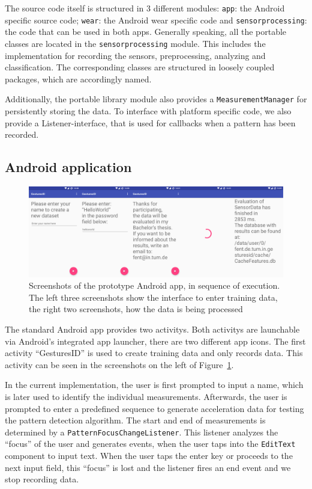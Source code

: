 The source code itself is structured in 3 different modules: \lstinline$app$: the Android specific source code; \lstinline$wear$: the Android wear specific code and \lstinline$sensorprocessing$: the code that can be used in both apps. Generally speaking, all the portable classes are located in the \lstinline$sensorprocessing$ module. This includes the implementation for recording the sensors, preprocessing, analyzing and classification. The corresponding classes are structured in loosely coupled \glspl{package}, which are accordingly named.

Additionally, the portable library module also provides a \lstinline$MeasurementManager$ for persistently storing the data. To interface with platform specific code, we also provide a Listener-interface, that is used for callbacks when a pattern has been recorded.

\subsection{Android application}
\begin{figure}
    \centering
    \includegraphics[width=\textwidth]{figures/MeasurementPhone.png}
    \caption{Screenshots of the prototype Android \gls{app}, in sequence of execution. The left three screenshots show the interface to enter training data, the right two screenshots, how the data is being processed}
    \label{fig:phonescreenshot}
\end{figure}

The standard Android \gls{app} provides two \glspl{activity}. Both \glspl{activity} are launchable via Android's integrated \gls{app} launcher, \ie there are two different \gls{app} icons. The first \gls{activity} ``GesturesID'' is used to create training data and only records data. This activity can be seen in the screenshots on the left of Figure~\ref{fig:phonescreenshot}.

In the current implementation, the user is first prompted to input a name, which is later used to identify the individual measurements. Afterwards, the user is prompted to enter a predefined sequence  to generate acceleration data for testing the pattern detection algorithm. The start and end of measurements is determined by a \lstinline$PatternFocusChangeListener$. This listener analyzes the ``focus'' of the user and generates events, when the user taps into the \lstinline$EditText$ component to input text. When the user taps the enter key or proceeds to the next input field, this ``focus'' is lost and the listener fires an end event and we stop recording data.

